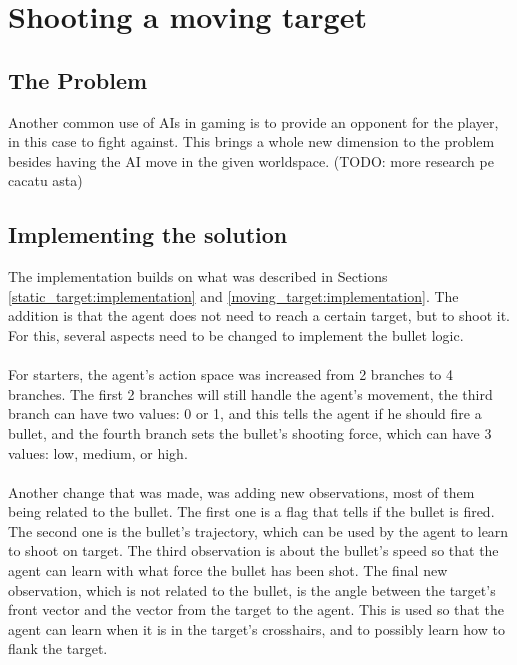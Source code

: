 


\section{Shooting a moving target}

\subsection{The Problem}

Another common use of AIs in gaming is to provide an opponent for the player, in this case to fight against. This brings a whole new dimension to the problem besides having the AI move in the given worldspace. (TODO: more research pe cacatu asta)

\subsection{Implementing the solution}

The implementation builds on what was described in Sections \ref{static_target:implementation} and \ref{moving_target:implementation}. The addition is that the agent does not need to reach a certain target, but to shoot it. For this, several aspects need to be changed to implement the bullet logic.

\paragraph{}
For starters, the agent's action space was increased from 2 branches to 4 branches. The first 2 branches will still handle the agent's movement, the third branch can have two values: 0 or 1, and this tells the agent if he should fire a bullet, and the fourth branch sets the bullet's shooting force, which can have 3 values: low, medium, or high.

\paragraph{}
Another change that was made, was adding new observations, most of them being related to the bullet. The first one is a flag that tells if the bullet is fired. The second one is the bullet's trajectory, which can be used by the agent to learn to shoot on target. The third observation is about the bullet's speed so that the agent can learn with what force the bullet has been shot. The final new observation, which is not related to the bullet, is the angle between the target's front vector and the vector from the target to the agent. This is used so that the agent can learn when it is in the target's crosshairs, and to possibly learn how to flank the target. 

